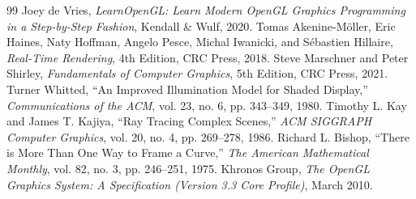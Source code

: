 \begingroup
\renewcommand{\chapter}[2]{%
  \section*{#2}%
  \addcontentsline{toc}{section}{#2}%
}
\begin{thebibliography}{99}
 Joey de Vries, \textit{LearnOpenGL: Learn Modern OpenGL Graphics Programming in a Step-by-Step Fashion}, Kendall \& Wulf, 2020.
 Tomas Akenine-M{\"o}ller, Eric Haines, Naty Hoffman, Angelo Pesce, Michal Iwanicki, and S{\'e}bastien Hillaire, \textit{Real-Time Rendering}, 4th Edition, CRC Press, 2018.
 Steve Marschner and Peter Shirley, \textit{Fundamentals of Computer Graphics}, 5th Edition, CRC Press, 2021.
 Turner Whitted, ``An Improved Illumination Model for Shaded Display,'' \textit{Communications of the ACM}, vol. 23, no. 6, pp. 343--349, 1980.
 Timothy L. Kay and James T. Kajiya, ``Ray Tracing Complex Scenes,'' \textit{ACM SIGGRAPH Computer Graphics}, vol. 20, no. 4, pp. 269--278, 1986.
 Richard L. Bishop, ``There is More Than One Way to Frame a Curve,'' \textit{The American Mathematical Monthly}, vol. 82, no. 3, pp. 246--251, 1975.
 Khronos Group, \textit{The OpenGL Graphics System: A Specification (Version 3.3 Core Profile)}, March 2010.
\end{thebibliography}
\endgroup

